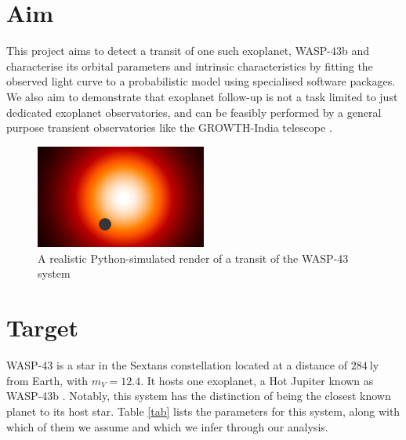 \documentclass[12pt]{article}
\begin{document}
\section{Aim}
This project aims to detect a transit of one such exoplanet, WASP-43b and characterise its orbital parameters and intrinsic characteristics by fitting the observed light curve to a probabilistic model using specialised software packages. We also aim to demonstrate that exoplanet follow-up is not a task limited to just dedicated exoplanet observatories, and can be feasibly performed by a general purpose transient observatories like the GROWTH-India telescope \citep{Kumar_2022}.

\begin{figure}[h]
    \centering
    \includegraphics[width = 0.5\textwidth]{./images/WASP-43b-13.png}
    \caption{A realistic Python-simulated render of a transit of the WASP-43 system}
\end{figure}

\section{Target}

WASP-43 is a star in the Sextans constellation located at a distance of $284 \ \mathrm{ly}$ from Earth, with $m_{V} = 12.4$. It hosts one exoplanet, a Hot Jupiter known as WASP-43b \citep{Hellier_2011}. Notably, this system has the distinction of being the closest known planet to its host star. Table \ref{tab} lists the parameters for this system, along with which of them we assume and which we infer through our analysis.
\end{document}
